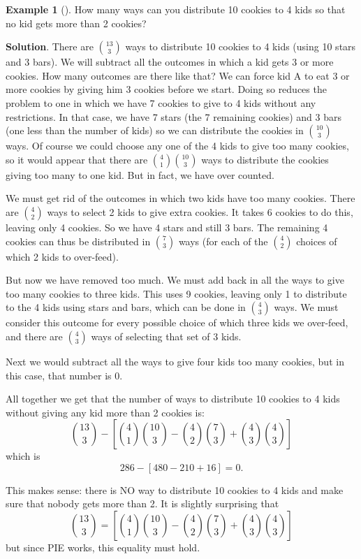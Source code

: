 \documentclass[10pt,]{book}
\theoremstyle{plain}
\theoremstyle{definition}
\theoremstyle{definition}
\newtheorem{example}[theorem]{Example}
\theoremstyle{definition}
\theoremstyle{definition}
\numberwithin{equation}{chapter}
\begin{document}
\begin{example}[]\label{example-12}
\hypertarget{p-956}{}%
How many ways can you distribute 10 cookies to 4 kids so that no kid gets more than 2 cookies?%
\par\smallskip%
\noindent\textbf{Solution}.\hypertarget{solution-79}{}\quad%
\hypertarget{p-957}{}%
There are \({13 \choose 3}\) ways to distribute 10 cookies to 4 kids (using 10 stars and 3 bars).  We will subtract all the outcomes in which a kid gets 3 or more cookies. How many outcomes are there like that? We can force kid A to eat 3 or more cookies by giving him 3 cookies before we start. Doing so reduces the problem to one in which we have 7 cookies to give to 4 kids without any restrictions. In that case, we have 7 stars (the 7 remaining cookies) and 3 bars (one less than the number of kids) so we can distribute the cookies in \({10 \choose 3}\) ways. Of course we could choose any one of the 4 kids to give too many cookies, so it would appear that there are \({4 \choose 1}{10 \choose 3}\) ways to distribute the cookies giving too many to one kid. But in fact, we have over counted.%
\par
\hypertarget{p-958}{}%
We must get rid of the outcomes in which two kids have too many cookies. There are \({4 \choose 2}\) ways to select 2 kids to give extra cookies. It takes 6 cookies to do this, leaving only 4 cookies. So we have 4 stars and still 3 bars. The remaining 4 cookies can thus be distributed in \({7 \choose 3}\) ways (for each of the \({4 \choose 2}\) choices of which 2 kids to over-feed).%
\par
\hypertarget{p-959}{}%
But now we have removed too much. We must add back in all the ways to give too many cookies to three kids. This uses 9 cookies, leaving only 1 to distribute to the 4 kids using stars and bars, which can be done in \({4 \choose 3}\) ways. We must consider this outcome for every possible choice of which three kids we over-feed, and there are \({4 \choose 3}\) ways of selecting that set of 3 kids.%
\par
\hypertarget{p-960}{}%
Next we would subtract all the ways to give four kids too many cookies, but in this case, that number is 0.%
\par
\hypertarget{p-961}{}%
All together we get that the number of ways to distribute 10 cookies to 4 kids without giving any kid more than 2 cookies is:%
\begin{equation*}
{13 \choose 3} - \left[{4 \choose 1}{10 \choose 3} - {4 \choose 2}{7 \choose 3} + {4\choose 3}{4\choose 3}\right]
\end{equation*}
which is%
\begin{equation*}
286 - [480 - 210 + 16] = 0.
\end{equation*}
%
\par
\hypertarget{p-962}{}%
This makes sense: there is NO way to distribute 10 cookies to 4 kids and make sure that nobody gets more than 2. It is slightly surprising that%
\begin{equation*}
{13 \choose 3} = \left[{4 \choose 1}{10 \choose 3} - {4 \choose 2}{7 \choose 3} + {4\choose 3}{4\choose 3}\right]
\end{equation*}
but since PIE works, this equality must hold.%
\end{example}
\end{document}
